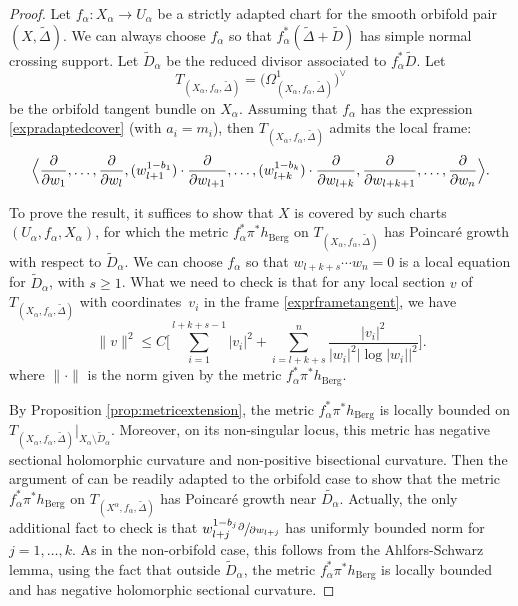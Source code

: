 \documentclass[10pt]{amsart}
\theoremstyle{plain}
\theoremstyle{definition}
\numberwithin{equation}{theorem}
\newcommand{\norm}[1] { \| #1 \| }
\begin{document}
\begin{proof}
Let $f_\alpha : X_\alpha \to U_\alpha$ be a strictly adapted chart for the smooth orbifold pair $(X, \widetilde{\Delta})$. We can always choose $f_\alpha$ so that $f_\alpha^\ast (\widetilde{\Delta} + \widetilde{D})$ has simple normal crossing support. Let $\widetilde{D}_\alpha$ be the reduced divisor associated to $f^\ast_\alpha \widetilde{D}$. Let
\[
T_{(X_\alpha, f_\alpha, \widetilde{\Delta})} = \bigl( \Omega^1_{(X_\alpha, f_\alpha, \widetilde{\Delta})} \bigr)^{\vee}
\]
be the orbifold tangent bundle on $X_\alpha$. Assuming that $f_\alpha$ has the expression \eqref{expradaptedcover} (with $a_i = m_i$), then $T_{(X_\alpha, f_\alpha, \widetilde{\Delta})}$ admits the local frame:
\begin{equation} \label{exprframetangent}
\Bigl\langle \frac{\partial}{\partial w_1} , \ldots, \frac{\partial}{\partial w_l}, (w^{1 - b_1}_{l+1})\cdot \frac{\partial}{\partial w_{l+1}}, \ldots, (w^{1 - b_k}_{l+k})\cdot \frac{\partial}{\partial w_{l+k}},
\frac{\partial}{\partial w_{l+k+1}}, \ldots, \frac{\partial}{\partial w_n} \Bigr\rangle.
\end{equation}

To prove the result, it suffices to show that $X$ is covered by such charts $(U_\alpha, f_\alpha, X_\alpha)$, for which the metric $f_\alpha^\ast \pi^\ast h_{\mathrm{Berg}}$ on $T_{(X_\alpha, f_\alpha, \widetilde{\Delta})}$ has Poincaré growth with respect to $\widetilde{D}_\alpha$. We can choose $f_\alpha$ so that $w_{l+k+s} \cdots w_{n} = 0$ is a local equation for $\widetilde{D}_\alpha$, with $s \geq 1$. What we need to check is that for any local section $v$ of $T_{(X_\alpha, f_\alpha, \widetilde{\Delta})}$ with coordinates~$v_i$ in the frame \eqref{exprframetangent}, we have
$$
\norm{v}^2 \leq C \biggl[ \sum_{i =1}^{l+ k + s - 1} |v_i|^2 + \sum_{i=l+k+s}^{n} \frac{|v_i|^2}{|w_i|^2 \left| \log |w_i| \right|^2} \biggr].
$$
where $\norm{\cdot}$ is the norm given by the metric $f_\alpha^\ast \pi^\ast h_{\mathrm{Berg}}$.

By Proposition \ref{prop:metricextension}, the metric $f^\ast_\alpha \pi^\ast h_{\mathrm{Berg}}$ is locally bounded on $T_{(X_\alpha, f_\alpha, \widetilde{\Delta})}|_{X_\alpha \setminus \widetilde{D}_\alpha}$. Moreover, on its non-singular locus, this metric has negative sectional holomorphic curvature and non-positive bisectional curvature. Then the argument of \cite[Prop.\,2.4]{BC18} can be readily adapted to the orbifold case to show that the metric $f^\ast_\alpha \pi^\ast h_{\mathrm{Berg}}$ on $T_{(X^\alpha, f_\alpha, \widetilde{\Delta})}$ has Poincaré growth near $\widetilde{D_\alpha}$. Actually, the only additional fact to check is that $w_{l+j}^{1 - b_{j}}\sfrac{\partial}{\partial w_{l+j}}$ has uniformly bounded norm for $j = 1, \ldots, k$. As in the non-orbifold case, this follows from the Ahlfors-Schwarz lemma, using the fact that outside $\widetilde{D}_\alpha$, the metric $f_\alpha^\ast \pi^\ast h_\mathrm{Berg}$ is locally bounded and has negative holomorphic sectional curvature.
\end{proof}
\end{document}
